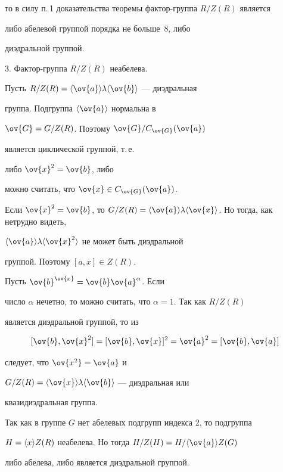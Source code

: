 то в силу п.\,1 доказательства теоремы фактор-группа $R/Z(R)$ является 


либо абелевой группой порядка не больше~8, либо


диэдральной группой.


\smallskip





3. Фактор-группа $R/Z(R)$ неабелева.


Пусть $R/Z(R)=\ls\ov{a}\ps\lambda\ls\ov{b}\ps$ --- диэдральная


группа. Подгруппа $\ls\ov{a}\ps$ нормальна в


$\ov{G}=G/Z(R)$. Поэтому $\ov{G}/C_{\ov{G}}(\ov{a})$


является циклической группой, т.\,е.


либо $\ov{x}^2=\ov{b}$, либо


можно считать, что $\ov{x}\in C_{\ov{G}}(\ov{a})$.


Если $\ov{x}^2=\ov{b}$, то $G/Z(R)=


\ls\ov{a}\ps\lambda\ls\ov{x}\ps$. Но тогда, как нетрудно видеть,


$\ls\ov{a}\ps\lambda\ls\ov{x}^2\ps$ не может быть диэдральной


группой. Поэтому $[a,x]\in Z(R)$.





Пусть $\ov{b}^{\ov{x}}=\ov{b}\ov{a}^{\alpha}$. Если


число $\alpha$ нечетно, то можно считать, что $\alpha=1$. Так как $R/Z(R)$


является диэдральной группой, то из


$$


[\ov{b},\ov{x}^2]=


[\ov{b},\ov{x}]^2=\ov{a}^2=[\ov{b},\ov{a}]


$$


следует, что $\ov{x^2}=\ov{a}$ и


$G/Z(R)=\ls\ov{x}\ps\lambda\ls\ov{b}\ps$ --- диэдральная или


квазидиэдральная группа.





Так как в группе $G$ нет абелевых подгрупп индекса 2, то подгруппа


$H=\langle x\rangle Z(R)$ неабелева. Но тогда $H/Z(H)=H/\ls\ov{a}\ps Z(G)$


либо абелева, либо является диэдральной группой.





